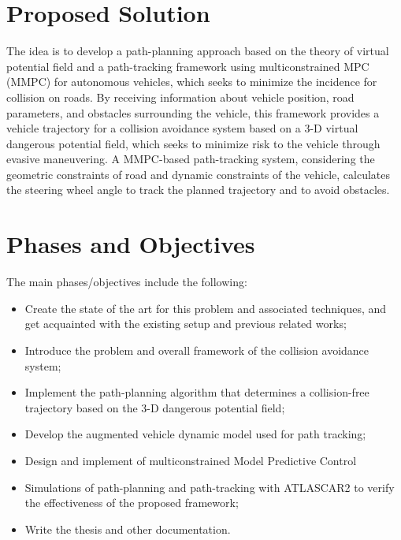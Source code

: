 \documentclass[11pt]{IEEEtran}
\begin{document}
\section{Proposed Solution}
The idea is to develop a path-planning approach based on the
theory of virtual potential field and a path-tracking framework using multiconstrained MPC (MMPC) for autonomous vehicles, which seeks to minimize the incidence for collision on roads. By receiving information about vehicle position, road parameters, and obstacles surrounding the vehicle, this framework provides a vehicle trajectory for a collision avoidance system based on a 3-D virtual dangerous potential field, which seeks to minimize risk to the vehicle through evasive maneuvering. A MMPC-based path-tracking system, considering the geometric constraints of road and dynamic constraints of the vehicle, calculates the steering wheel angle to track the planned trajectory and to avoid obstacles.

\section{Phases and Objectives}
The main phases/objectives include the following:
\begin{itemize}
	\item Create the state of the art for this problem and associated techniques, and get acquainted with the existing setup and previous related works;
	\item Introduce the problem and overall framework of the collision avoidance system;
	\item Implement the path-planning algorithm that determines a collision-free trajectory based on the 3-D dangerous potential field;
	\item Develop the augmented vehicle dynamic model used for path tracking;
	\item Design and implement of multiconstrained Model Predictive Control
	\item Simulations of path-planning and path-tracking with ATLASCAR2 to verify the effectiveness of the proposed framework;
	\item Write the thesis and other documentation.
\end{itemize}
\end{document}
